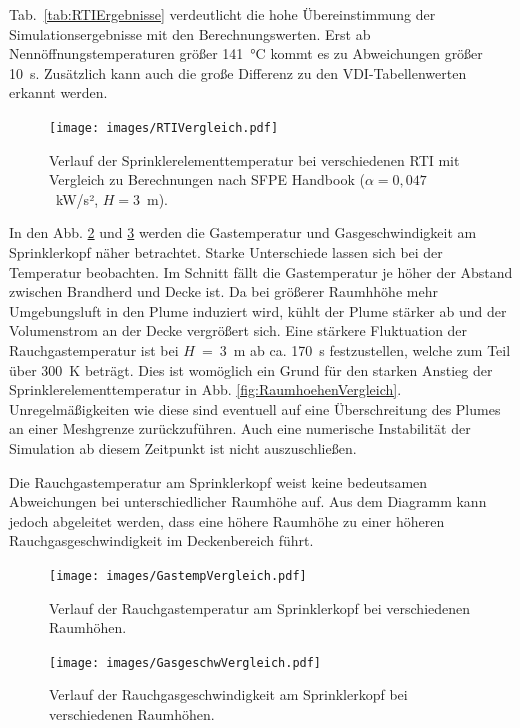 Tab.~\ref{tab:RTIErgebnisse} verdeutlicht die hohe Übereinstimmung der Simulationsergebnisse mit den Berechnungswerten. Erst ab Nennöffnungstemperaturen größer 141~°C kommt es zu Abweichungen größer 10~s. Zusätzlich kann auch die große Differenz zu den VDI-Tabellenwerten erkannt werden.


\begin{figure}
    \centering
    \texttt{[image: images/RTIVergleich.pdf]}
    \caption{Verlauf der Sprinklerelementtemperatur bei verschiedenen RTI mit Vergleich zu Berechnungen nach SFPE Handbook ($\alpha=0{,}047$~kW/s², $H=3$~m).}
    \label{fig:RTIVergleich}
\end{figure}


In den Abb. \ref{fig:GastempVergleich} und \ref{fig:GasgeschwVergleich} werden die Gastemperatur und Gasgeschwindigkeit am Sprinklerkopf näher betrachtet. Starke Unterschiede lassen sich bei der Temperatur beobachten. Im Schnitt fällt die Gastemperatur je höher der Abstand zwischen Brandherd und Decke ist. Da bei größerer Raumhhöhe mehr Umgebungsluft in den Plume induziert wird, kühlt der Plume stärker ab und der Volumenstrom an der Decke vergrößert sich. 
Eine stärkere Fluktuation der Rauchgastemperatur ist bei $H$~=~3~m ab ca. 170~s festzustellen, welche zum Teil über 300~K beträgt. Dies ist womöglich ein Grund für den starken Anstieg der Sprinklerelementtemperatur in Abb. \ref{fig:RaumhoehenVergleich}. Unregelmäßigkeiten wie diese sind eventuell auf eine Überschreitung des Plumes an einer Meshgrenze zurückzuführen. Auch eine numerische Instabilität der Simulation ab diesem Zeitpunkt ist nicht auszuschließen.

Die Rauchgastemperatur am Sprinklerkopf weist keine bedeutsamen Abweichungen bei unterschiedlicher Raumhöhe auf. Aus dem Diagramm kann jedoch abgeleitet werden, dass eine höhere Raumhöhe zu einer höheren Rauchgasgeschwindigkeit im Deckenbereich führt. 


\begin{figure}
    \centering
    \texttt{[image: images/GastempVergleich.pdf]}
    \caption{Verlauf der Rauchgastemperatur am Sprinklerkopf bei verschiedenen Raumhöhen.}
    \label{fig:GastempVergleich}
\end{figure}
\begin{figure}
    \centering
    \texttt{[image: images/GasgeschwVergleich.pdf]}
    \caption{Verlauf der Rauchgasgeschwindigkeit am Sprinklerkopf bei verschiedenen Raumhöhen.}
    \label{fig:GasgeschwVergleich}
\end{figure}



